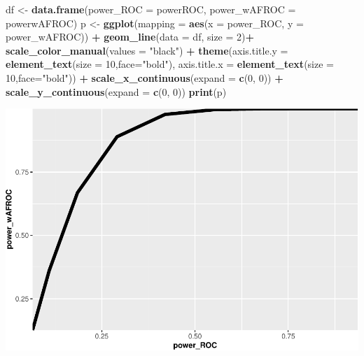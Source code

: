 \documentclass[]{book}
\newenvironment{Shaded}{\begin{snugshade}}{\end{snugshade}}
\newcommand{\DataTypeTok}[1]{\textcolor[rgb]{0.13,0.29,0.53}{#1}}
\newcommand{\DecValTok}[1]{\textcolor[rgb]{0.00,0.00,0.81}{#1}}
\newcommand{\KeywordTok}[1]{\textcolor[rgb]{0.13,0.29,0.53}{\textbf{#1}}}
\newcommand{\NormalTok}[1]{#1}
\newcommand{\OperatorTok}[1]{\textcolor[rgb]{0.81,0.36,0.00}{\textbf{#1}}}
\newcommand{\StringTok}[1]{\textcolor[rgb]{0.31,0.60,0.02}{#1}}
\begin{document}
\begin{Shaded}
\begin{Highlighting}[]
\NormalTok{df <-}\StringTok{ }\KeywordTok{data.frame}\NormalTok{(}\DataTypeTok{power_ROC =}\NormalTok{ powerROC, }\DataTypeTok{power_wAFROC =}\NormalTok{ powerwAFROC)}
\NormalTok{p <-}\StringTok{ }\KeywordTok{ggplot}\NormalTok{(}\DataTypeTok{mapping =} \KeywordTok{aes}\NormalTok{(}\DataTypeTok{x =}\NormalTok{ power_ROC, }\DataTypeTok{y =}\NormalTok{ power_wAFROC)) }\OperatorTok{+}
\StringTok{  }\KeywordTok{geom_line}\NormalTok{(}\DataTypeTok{data =}\NormalTok{ df, }\DataTypeTok{size =} \DecValTok{2}\NormalTok{)}\OperatorTok{+}
\StringTok{  }\KeywordTok{scale_color_manual}\NormalTok{(}\DataTypeTok{values =} \StringTok{"black"}\NormalTok{) }\OperatorTok{+}\StringTok{ }
\StringTok{  }\KeywordTok{theme}\NormalTok{(}\DataTypeTok{axis.title.y =} \KeywordTok{element_text}\NormalTok{(}\DataTypeTok{size =} \DecValTok{10}\NormalTok{,}\DataTypeTok{face=}\StringTok{"bold"}\NormalTok{),}
        \DataTypeTok{axis.title.x =} \KeywordTok{element_text}\NormalTok{(}\DataTypeTok{size =} \DecValTok{10}\NormalTok{,}\DataTypeTok{face=}\StringTok{"bold"}\NormalTok{))  }\OperatorTok{+}
\StringTok{  }\KeywordTok{scale_x_continuous}\NormalTok{(}\DataTypeTok{expand =} \KeywordTok{c}\NormalTok{(}\DecValTok{0}\NormalTok{, }\DecValTok{0}\NormalTok{)) }\OperatorTok{+}\StringTok{ }
\StringTok{  }\KeywordTok{scale_y_continuous}\NormalTok{(}\DataTypeTok{expand =} \KeywordTok{c}\NormalTok{(}\DecValTok{0}\NormalTok{, }\DecValTok{0}\NormalTok{))}
\KeywordTok{print}\NormalTok{(p)}
\end{Highlighting}
\end{Shaded}

\begin{center}\includegraphics{17-FrocSampleSize1_files/figure-latex/unnamed-chunk-14-1} \end{center}
\end{document}
